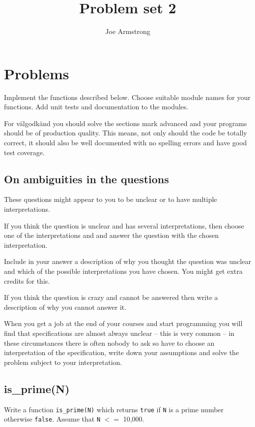 \documentclass[12pt]{hitec}
\title{Problem set 2}
\author{Joe Armstrong}
\date{}
\begin{document}
\maketitle

\tableofcontents

\section{Problems}

Implement the functions described below. Choose suitable module names
for your functions. Add unit tests and documentation to the modules.

For v\"{a}lgodk\"{a}nd you should solve the sections mark advanced and
your programs should be of production quality. This means, not only
should the code be totally correct, it should also be well documented
with no spelling errors and have good test coverage.

\subsection*{On ambiguities in the questions}

These questions might appear to you to be unclear or to have multiple
interpretations.

If you think the question is unclear and has several interpretations,
then choose one of the interpretations and and answer the question
with the chosen interpretation.

Include in your answer a description of why you thought the question
was unclear and which of the possible interpretations you have
chosen. You might get extra credits for this.

If you think the question is crazy and cannot be answered then write a
description of why you cannot answer it.

When you get a job at the end of your courses and start programming
you will find that specifications are almost always unclear -- this is very
common -- in these circumstances there is often nobody to ask so have
to choose an interpretation of the specification, write down your
assumptions and solve the problem subject to your interpretation.
 
\subsection{is\_prime(N)}

Write a function \verb+is_prime(N)+ which returns \verb+true+ if
\verb+N+ is a prime number otherwise \verb+false+. Assume that
\verb+N+ $<=$ 10,000.
\end{document}
